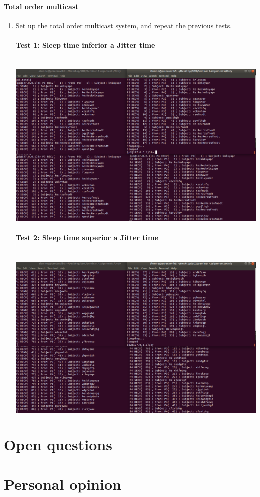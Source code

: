 \documentclass[a4paper, 10pt]{article}
\begin{document}
\newpage\paragraph[bold]{Total order multicast}
\begin{enumerate}
\item  Set up the total order multicast system, and repeat the previous tests.
\paragraph[bold]{Test 1: Sleep time inferior a Jitter time\\\\}
\includegraphics[width=\textwidth]{ordy-total-1}
\newpage\paragraph[bold]{Test 2: Sleep time superior a Jitter time\\\\}
\includegraphics[width=\textwidth]{ordy-total-2}
\end{enumerate}

\newpage
\section{Open questions}

\newpage
\section{Personal opinion}
\end{document}
